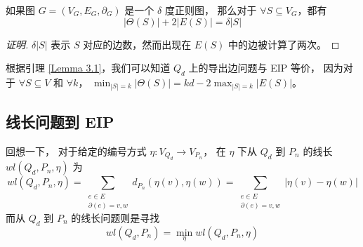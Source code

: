 \begin{lemma}
\label{Lemma 3.1}
如果图 $G = (V_G, E_G, \partial_G)$ 是一个 $\delta$ 度正则图，
那么对于 $\forall S \subseteq V_G$，都有
\begin{equation*}
|\Theta(S)| + 2 |E(S)| = \delta |S|
\end{equation*}
\end{lemma}

\begin{proof}[证明]
$\delta |S|$ 表示 $S$ 对应的边数，然而出现在 $E(S)$ 中的边被计算了两次。
\end{proof}

根据引理 \ref{Lemma 3.1}，我们可以知道 $Q_d$ 上的导出边问题与 EIP 等价，
因为对于 $\forall S \subseteq V$ 和 $\forall k$，
$\min_{|S| = k} |\Theta(S)| = k d − 2 \max_{|S| = k} |E(S)|$。

\subsection{线长问题到 EIP}
\label{Subsection 3.1.2}

回想一下，
对于给定的编号方式 $\eta \colon V_{Q_d} \rightarrow V_{P_n}$，
在 $\eta$ 下从 $Q_d$ 到 $P_n$ 的线长 $wl(Q_d, P_n, \eta)$ 为
\begin{equation*}
wl(Q_d, P_n, \eta) = \sum_{\substack{
	e \in E \\
	\partial(e) = {v, w}
}} d_{P_n}(\eta(v), \eta(w)) = \sum_{\substack{
	e \in E \\
	\partial(e) = {v, w}
}} |\eta(v) - \eta(w)|
\end{equation*}
而从 $Q_d$ 到 $P_n$ 的线长问题则是寻找
\begin{equation*}
wl(Q_d, P_n) = \min_\eta wl(Q_d, P_n, \eta)
\end{equation*}


